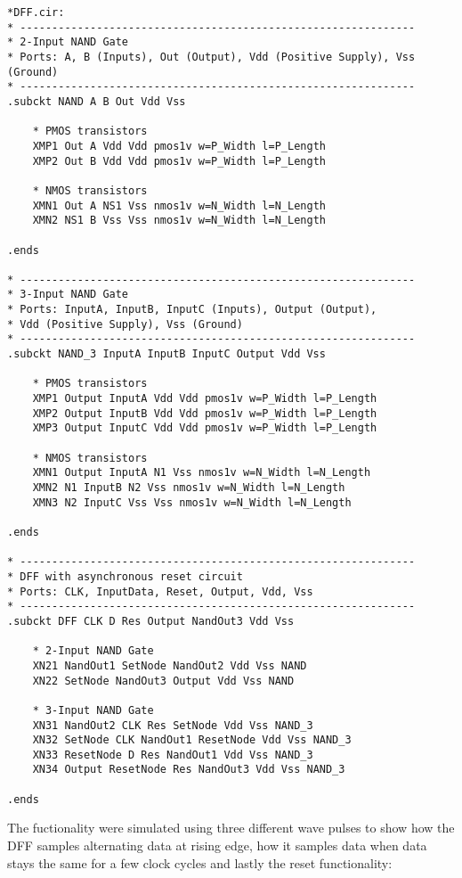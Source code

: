 \begin{lstlisting}
*DFF.cir:
* --------------------------------------------------------------
* 2-Input NAND Gate
* Ports: A, B (Inputs), Out (Output), Vdd (Positive Supply), Vss (Ground)
* --------------------------------------------------------------
.subckt NAND A B Out Vdd Vss

    * PMOS transistors
    XMP1 Out A Vdd Vdd pmos1v w=P_Width l=P_Length 
    XMP2 Out B Vdd Vdd pmos1v w=P_Width l=P_Length 

    * NMOS transistors
    XMN1 Out A NS1 Vss nmos1v w=N_Width l=N_Length 
    XMN2 NS1 B Vss Vss nmos1v w=N_Width l=N_Length 

.ends

* --------------------------------------------------------------
* 3-Input NAND Gate
* Ports: InputA, InputB, InputC (Inputs), Output (Output), 
* Vdd (Positive Supply), Vss (Ground)
* --------------------------------------------------------------
.subckt NAND_3 InputA InputB InputC Output Vdd Vss

    * PMOS transistors
    XMP1 Output InputA Vdd Vdd pmos1v w=P_Width l=P_Length 
    XMP2 Output InputB Vdd Vdd pmos1v w=P_Width l=P_Length
    XMP3 Output InputC Vdd Vdd pmos1v w=P_Width l=P_Length

    * NMOS transistors
    XMN1 Output InputA N1 Vss nmos1v w=N_Width l=N_Length 
    XMN2 N1 InputB N2 Vss nmos1v w=N_Width l=N_Length
    XMN3 N2 InputC Vss Vss nmos1v w=N_Width l=N_Length  

.ends

* --------------------------------------------------------------
* DFF with asynchronous reset circuit
* Ports: CLK, InputData, Reset, Output, Vdd, Vss
* --------------------------------------------------------------
.subckt DFF CLK D Res Output NandOut3 Vdd Vss

    * 2-Input NAND Gate
    XN21 NandOut1 SetNode NandOut2 Vdd Vss NAND
    XN22 SetNode NandOut3 Output Vdd Vss NAND

    * 3-Input NAND Gate
    XN31 NandOut2 CLK Res SetNode Vdd Vss NAND_3 
    XN32 SetNode CLK NandOut1 ResetNode Vdd Vss NAND_3 
    XN33 ResetNode D Res NandOut1 Vdd Vss NAND_3 
    XN34 Output ResetNode Res NandOut3 Vdd Vss NAND_3 

.ends
\end{lstlisting}

The fuctionality were simulated using three different wave pulses to show how the DFF samples alternating data at rising edge, how it samples data when data stays the same for a few clock cycles and lastly the reset functionality:

